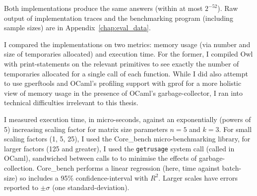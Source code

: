 Both implementations produce the same answers (within at most $2^{-52}$). Raw
output of implementation traces and the benchmarking program (including sample
sizes) are in Appendix~\ref{chap:eval_data}.

I compared the implementations on two metrics: memory usage (via number and
size of temporaries allocated) and execution time. For the former, I compiled
Owl with print-statements on the relevant primitives to see exactly the number
of temporaries allocated for a single call of each function. While I did also
attempt to use gperftools and OCaml's profiling support with gprof for a more
holistic view of memory usage in the presence of OCaml's garbage-collector, I
ran into technical difficulties irrelevant to this thesis.

I measured execution time, in micro-seconds, against an exponentially (powers
of 5) increasing scaling factor for matrix size parameters $n=5$ and $k=3$.
For small scaling factors (1, 5, 25), I used the Core\_bench micro-benchmarking
library, for larger factors (125 and greater), I used the \texttt{getrusage}
system call (called  in OCaml), sandwiched between calls to
 to minimise the effects of garbage-collection.
Core\_bench performs a linear regression (here, time against batch-size) so
includes a 95\% confidence-interval with $R^2$. Larger scales have
errors reported to $\pm \sigma$ (one standard-deviation).

